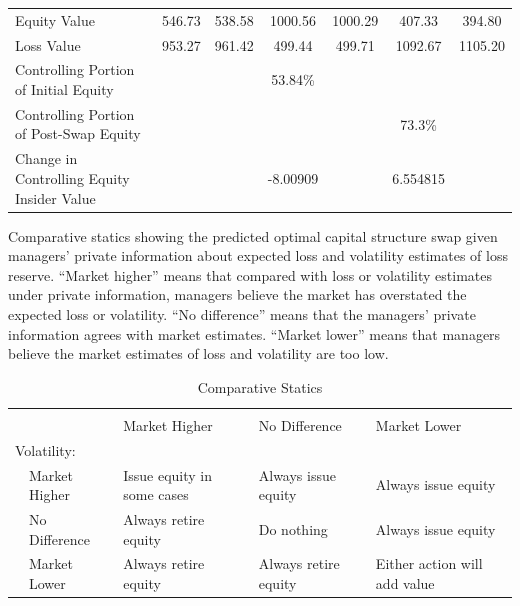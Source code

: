 \begin{table}
\begin{center}
\begin{tabular}{p{2in}cccccc}
\midrule

Equity Value & 546.73 &   538.58 &   1000.56 &   1000.29 &     407.33 &    394.80 \\ 

Loss Value & 953.27 &   961.42 &   499.44 &   499.71 &    1092.67 &   1105.20 \\ \hline

\midrule 

Controlling Portion of Initial Equity &            &            &   53.84\% &            &            &            \\ 

Controlling Portion of Post-Swap Equity &            &            &            &            &   73.3\% &            \\ 

\midrule

Change in Controlling Equity Insider Value &            &            &   -8.00909 &            &   6.554815 &            \\ 

\bottomrule

\end{tabular}  
\end{center}
\end{table}

\begin{table}\caption{Comparative Statics\label{tab:compstat}}
\begin{small}Comparative statics showing the predicted optimal capital structure swap given managers' private information about expected loss and volatility estimates of loss reserve.  ``Market higher'' means that compared with loss or volatility estimates under private information, managers believe the market has overstated the expected loss or volatility.  ``No difference'' means that the managers' private information agrees with market estimates. ``Market lower'' means that managers believe the market estimates of loss and volatility are too low.\end{small}
\begin{center}
\begin{tabular}{ll>{\raggedright}p{1.5in}>{\raggedright}p{1.5in}>{\raggedright}p{1.5in}}
\toprule
& & \multicolumn{3}{l}{Expected Loss:}\tabularnewline
& & Market Higher & No Difference & Market Lower \tabularnewline
\midrule
\multicolumn{2}{l}{Volatility:} & & & \tabularnewline
\addlinespace[1em]
 & Market Higher & \raggedright{Issue equity in some cases} & Always issue equity & Always issue equity\tabularnewline
\addlinespace[1em]
 & No Difference & Always retire equity & Do nothing & Always issue equity \tabularnewline
\addlinespace[1em]
 & Market Lower & Always retire equity & Always retire equity & \raggedright{Either action will add value} \tabularnewline
\bottomrule
\end{tabular}
\end{center}
\end{table}

